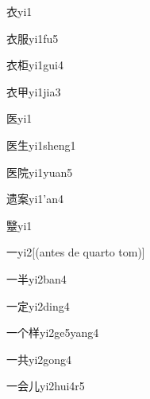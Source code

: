 \begin{verbete}[6]{衣}{yi1}
\end{verbete}
\begin{verbete}[6;8]{衣服}{yi1fu5}
\end{verbete}
\begin{verbete}[6;8]{衣柜}{yi1gui4}
\end{verbete}
\begin{verbete}[6;5]{衣甲}{yi1jia3}
\end{verbete}
\begin{verbete}[7]{医}{yi1}
\end{verbete}
\begin{verbete}[7;5]{医生}{yi1sheng1}
\end{verbete}
\begin{verbete}[7;9]{医院}{yi1yuan5}
\end{verbete}
\begin{verbete}[12;10]{遗案}{yi1'an4}
\end{verbete}
\begin{verbete}[18]{毉}{yi1}
\end{verbete}
\begin{verbete}[1]{一}{yi2}[(antes de quarto tom)]
\end{verbete}
\begin{verbete}[1;5]{一半}{yi2ban4}
\end{verbete}
\begin{verbete}[1;8]{一定}{yi2ding4}
\end{verbete}
\begin{verbete}[1;2;10]{一个样}{yi2ge5yang4}
\end{verbete}
\begin{verbete}[1;6]{一共}{yi2gong4}
\end{verbete}
\begin{verbete}[1;6;2]{一会儿}{yi2hui4r5}
\end{verbete}
